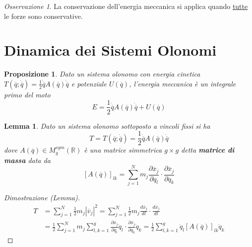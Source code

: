 \documentclass{book}
\theoremstyle{plain}
\theoremstyle{plain}
\newtheorem*{lemma}{Lemma}
\theoremstyle{plain}
\theoremstyle{plain}
\theoremstyle{plain}
\newtheorem{prop}{Proposizione}[chapter]
\theoremstyle{definition}
\theoremstyle{remark}
\newtheorem*{oss}{Osservazione}
\theoremstyle{definition}
\begin{document}
\begin{oss}
    La conservazione dell'energia meccanica si applica quando \underline{tutte} le forze sono conservative.
\end{oss}

\section{Dinamica dei Sistemi Olonomi}

\begin{prop}
    Dato un sistema olonomo con energia cinetica $T\left(\overline{q};\dot{\overline{q}}\right)=\frac{1}{2}\dot{\overline{q}}A\left(\overline{q}\right)\dot{\overline{q}}$ e potenziale $U\left(\overline{q}\right)$, l'energia meccanica è un integrale primo del moto
    \begin{displaymath}
        \boxed{
        E=\frac{1}{2}\dot{\overline{q}}A\left(\overline{q}\right)\dot{\overline{q}}+U\left(\overline{q}\right)
        }
    \end{displaymath}
\end{prop}

\begin{lemma}
    Dato un sistema olonomo sottoposto a vincoli fissi si ha
    \begin{displaymath}
        T=T\left(\overline{q};\dot{\overline{q}}\right)=\frac{1}{2}\dot{\overline{q}}A\left(\overline{q}\right)\dot{\overline{q}}
    \end{displaymath}
    dove $A\left(\overline{q}\right)\in M_g^{sym}(\mathbb{R})$ è una matrice simmetrica $g \times g$ detta \textbf{matrice di massa} data da
    \begin{displaymath}
        \boxed{
        \left[A\left(\overline{q}\right)\right]_{lk}=\sum_{j=1}^N m_j\frac{\partial\overline{x}_j}{\partial q_l} \cdot\frac{\partial\overline{x}_j}{\partial q_k}
        }
    \end{displaymath}
\end{lemma}

\begin{proof}[Dimostrazione (Lemma)]
    \[
    \begin{split}
        T&=\sum_{j=1}^N\frac{1}{2}m_j|\overline{v}_j|^2=\sum_{j=1}^N\frac{1}{2}m_j\frac{d\overline{x}_j}{dt}\cdot\frac{d\overline{x}_j}{dt} \\
        &=\frac{1}{2}\sum_{j=1}^Nm_j\sum_{l,k=1}^g\frac{\partial\overline{x}_j}{\partial q_l}\Dot{q}_l\cdot\frac{\partial\overline{x}_j}{\partial q_k}\Dot{q}_k=\frac{1}{2}\sum_{l,k=1}^g\Dot{q}_l\left[A\left(\overline{q}\right)\right]_{lk}\Dot{q}_k
    \end{split}
    \]
\end{proof}
\end{document}
